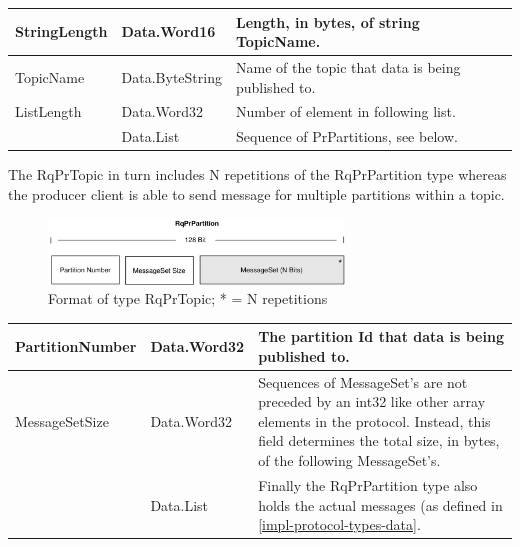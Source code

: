 \begin{table}[H]
\centering
\begin{tabular}{ l  l  p{10cm} }
\hline
StringLength      & Data.Word16     & Length, in bytes, of string TopicName.              \\ \hline
TopicName         & Data.ByteString & Name of the topic that data is being published to. \\ \hline
ListLength        & Data.Word32     & Number of element in following list.                \\ \hline
[RqPrPartition] & Data.List          & Sequence of PrPartitions, see below.                \\ \hline
\end{tabular}
\end{table}

The RqPrTopic in turn includes N repetitions of the RqPrPartition type
whereas the producer client is able to send message for multiple partitions
within a topic.  

\begin{figure}[H]
    \centering
    \includegraphics[width=0.7\textwidth]{images/impl-prot-types-prPartition.png}
    \caption{Format of type RqPrTopic; * = N repetitions }
    \label{fig:impl-prot-types-produceRequest}
\end{figure}

\begin{table}[H]
\centering
\begin{tabular}{ l  l  p{11cm} }
\hline
PartitionNumber & Data.Word32 & The partition Id that data is being published to.                                                                                                                                        \\ \hline
MessageSetSize  & Data.Word32 & Sequences of MessageSet's are not preceded by an int32 like other array elements in the protocol. Instead, this field determines the total size, in bytes, of the following MessageSet's. \\ \hline
[MessageSet]      & Data.List      & Finally the RqPrPartition type also holds the actual messages (as defined in \ref{impl-protocol-types-data}.                                                                                \\ \hline
\end{tabular}
\end{table}

